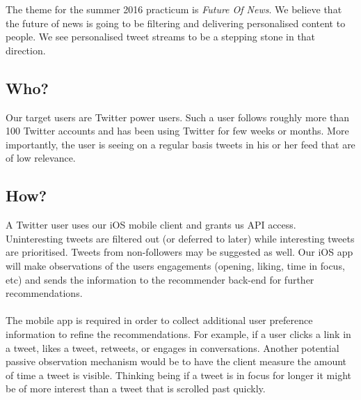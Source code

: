\documentclass{article}
\begin{document}
The theme for the summer 2016 practicum is \textit{Future Of News}. We believe that the future of news is going to be filtering and delivering personalised content to people. We see personalised tweet streams to be a stepping stone in that direction.

\subsection{Who?}
Our target users are Twitter power users. Such a user follows roughly more than 100 Twitter accounts and has been using Twitter for few weeks or months. More importantly, the user is seeing on a regular basis tweets in his or her feed that are of low relevance.

\subsection{How?}
A Twitter user uses our iOS mobile client and grants us API access. Uninteresting tweets are filtered out (or deferred to later) while interesting tweets are prioritised. Tweets from non-followers may be suggested as well. Our iOS app will make observations of the users engagements (opening, liking, time in focus, etc) and sends the information to the recommender back-end for further recommendations.
\\\\
The mobile app is required in order to collect additional user preference information to refine the recommendations. For example, if a user clicks a link in a tweet, likes a tweet, retweets, or engages in conversations. Another potential passive observation mechanism would be to have the client measure the amount of time a tweet is visible. Thinking being if a tweet is in focus for longer it might be of more interest than a tweet that is scrolled past quickly.
\end{document}
